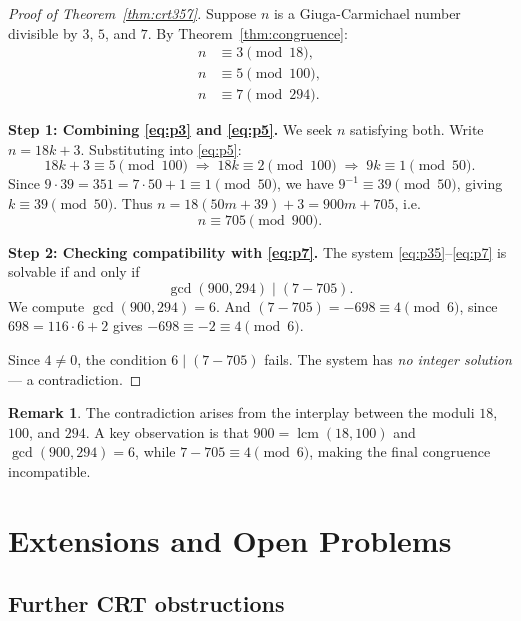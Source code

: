 \documentclass[12pt,a4paper]{amsart}
\theoremstyle{definition}
\newtheorem{remark}[theorem]{Remark}
\DeclareMathOperator{\lcm}{lcm}
\begin{document}
\begin{proof}[Proof of Theorem~\ref{thm:crt357}]
Suppose $n$ is a Giuga-Carmichael number divisible by $3$, $5$, and $7$.
By Theorem~\ref{thm:congruence}:
\begin{align}
  n &\equiv 3 \pmod{18},   \label{eq:p3} \\
  n &\equiv 5 \pmod{100},  \label{eq:p5} \\
  n &\equiv 7 \pmod{294}.  \label{eq:p7}
\end{align}

\noindent\textbf{Step 1: Combining \eqref{eq:p3} and \eqref{eq:p5}.}
We seek $n$ satisfying both.  Write $n = 18k + 3$.  Substituting into
\eqref{eq:p5}:
\[
  18k + 3 \equiv 5 \pmod{100}
  \;\Longrightarrow\;
  18k \equiv 2 \pmod{100}
  \;\Longrightarrow\;
  9k \equiv 1 \pmod{50}.
\]
Since $9 \cdot 39 = 351 = 7 \cdot 50 + 1 \equiv 1 \pmod{50}$, we have
$9^{-1} \equiv 39 \pmod{50}$, giving $k \equiv 39 \pmod{50}$.
Thus $n = 18(50m + 39) + 3 = 900m + 705$, i.e.\
\begin{equation}
  n \equiv 705 \pmod{900}.
  \label{eq:p35}
\end{equation}

\noindent\textbf{Step 2: Checking compatibility with \eqref{eq:p7}.}
The system \eqref{eq:p35}--\eqref{eq:p7} is solvable if and only if
\[
  \gcd(900, 294) \;\Big|\; (7 - 705).
\]
We compute $\gcd(900, 294) = 6$.  And $(7 - 705) = -698 \equiv 4 \pmod{6}$,
since $698 = 116 \cdot 6 + 2$ gives $-698 \equiv -2 \equiv 4 \pmod 6$.

Since $4 \ne 0$, the condition $6 \mid (7 - 705)$ fails.
The system has \emph{no integer solution} — a contradiction.
\end{proof}

\begin{remark}
The contradiction arises from the interplay between the moduli $18$, $100$,
and $294$.  A key observation is that $900 = \lcm(18, 100)$ and $\gcd(900, 294) = 6$,
while $7 - 705 \equiv 4 \pmod{6}$, making the final congruence incompatible.
\end{remark}

\section{Extensions and Open Problems}
\label{sec:open}

\subsection{Further CRT obstructions}
\end{document}
